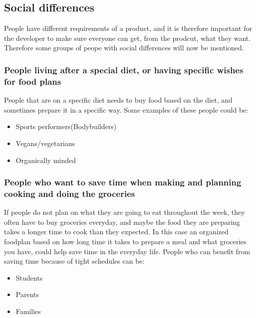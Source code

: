 \subsection{Social differences}

People have different requirements of a product, and it is therefore important for the developer to make sure everyone can get, from the prodcut, what they want. Therefore some groups of peope with social differences will now be mentioned.

\subsubsection{People living after a special diet, or having specific wishes for food plans}
People that are on a specific diet needs to buy food based on the diet, and sometimes prepare it in a specific way.
Some examples of these people could be:
\begin{itemize}
\item Sports performers(Bodybuilders)
\item Vegans/vegetarians
\item Organically minded
\end{itemize}

\subsubsection{People who want to save time when making and planning cooking and doing the groceries} 
If people do not plan on what they are going to eat throughout the week, they often have to buy groceries everyday, and maybe the food they are preparing takes a longer time to cook than they expected. In this case an organized foodplan based on how long time it takes to prepare a meal and what groceries you have, could help save time in the everyday life. People who can benefit from saving time because of tight schedules can be:
\begin{itemize}
\item Students
\item Parents
\item Families
\end{itemize}

